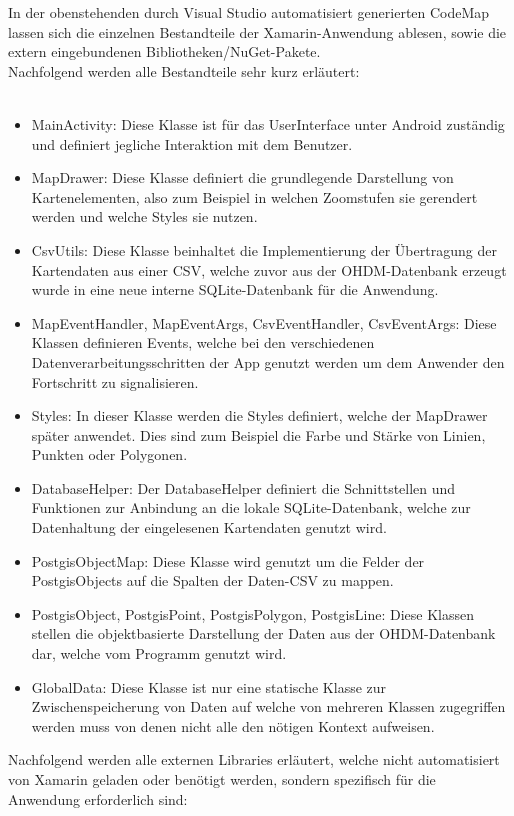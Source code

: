 In der obenstehenden durch Visual Studio automatisiert generierten CodeMap lassen sich die einzelnen Bestandteile der Xamarin-Anwendung ablesen, sowie die extern eingebundenen Bibliotheken/NuGet-Pakete.\\
\newpage
Nachfolgend werden alle Bestandteile sehr kurz erläutert:\\
\\
\begin{itemize}
	\item MainActivity: Diese Klasse ist für das UserInterface unter Android zuständig und definiert jegliche Interaktion mit dem Benutzer.
	\item MapDrawer: Diese Klasse definiert die grundlegende Darstellung von Kartenelementen, also zum Beispiel in welchen Zoomstufen sie gerendert werden und welche Styles sie nutzen.
	\item CsvUtils: Diese Klasse beinhaltet die Implementierung der Übertragung der Kartendaten aus einer CSV, welche zuvor aus der OHDM-Datenbank erzeugt wurde in eine neue interne SQLite-Datenbank für die Anwendung.
	\item MapEventHandler, MapEventArgs, CsvEventHandler, CsvEventArgs: Diese Klassen definieren Events, welche bei den verschiedenen Datenverarbeitungsschritten der App genutzt werden um dem Anwender den Fortschritt zu signalisieren.
	\item Styles: In dieser Klasse werden die Styles definiert, welche der MapDrawer später anwendet. Dies sind zum Beispiel die Farbe und Stärke von Linien, Punkten oder Polygonen.
	\item DatabaseHelper: Der DatabaseHelper definiert die Schnittstellen und Funktionen zur Anbindung an die lokale SQLite-Datenbank, welche zur Datenhaltung der eingelesenen Kartendaten genutzt wird.
	\item PostgisObjectMap: Diese Klasse wird genutzt um die Felder der PostgisObjects auf die Spalten der Daten-CSV zu mappen.
	\item PostgisObject, PostgisPoint, PostgisPolygon, PostgisLine: Diese Klassen stellen die objektbasierte Darstellung der Daten aus der OHDM-Datenbank dar, welche vom Programm genutzt wird.
	\item GlobalData: Diese Klasse ist nur eine statische Klasse zur Zwischenspeicherung von Daten auf welche von mehreren Klassen zugegriffen werden muss von denen nicht alle den nötigen Kontext aufweisen.
\end{itemize}
\newpage
Nachfolgend werden alle externen Libraries erläutert, welche nicht automatisiert von Xamarin geladen oder benötigt werden, sondern spezifisch für die Anwendung erforderlich sind:\\
